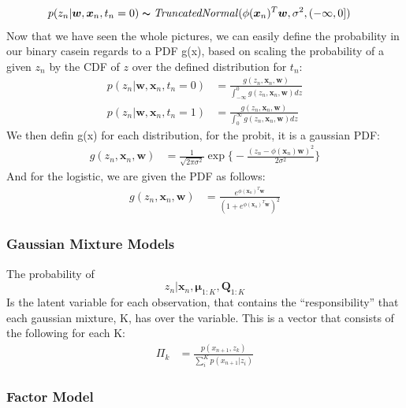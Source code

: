 \documentclass[a4paper,12pt]{article}\usepackage[]{graphicx}\usepackage[]{color}
\begin{document}
%
\begin{align*}
p(z_n | \bm{w}, \bm{x}_n, t_n = 0) &\thicksim \mathit{TruncatedNormal}(\phi(\bm{x}_n)^T\bm{w}, \sigma^2, (-\infty, 0])
\end{align*}
Now that we have seen the whole pictures, we can easily define the probability in our binary casein regards to a PDF g(x), based on scaling the probability of a given $z_n$ by the CDF of $z$ over the defined distribution for $t_n$:
\begin{align*}
p(z_n | \bm{w}, \bm{x}_n, t_n = 0) &= \frac{ g(z_n, \bm{x}_n, \bm{w})}{ \int_{-\infty}^{0} g(z_n, \bm{x}_n, \bm{w})  dz} \\
p(z_n | \bm{w}, \bm{x}_n, t_n = 1) &= \frac{ g(z_n, \bm{x}_n, \bm{w})}{ \int_{0}^{\infty} g(z_n, \bm{x}_n, \bm{w})  dz}
\end{align*}
We then defin g(x) for each distribution, for the probit, it is a gaussian PDF:
\begin{align*}
g(z_n, \bm{x}_n, \bm{w}) &= \frac{1}{\sqrt{2\pi\sigma^2}} \exp \Big\{  - \frac{(z_n - \phi(\bm{x}_n)\bm{w})^2}{2\sigma^2} \Big\}
\end{align*}
And for the logistic, we are given the PDF as follows:
\begin{align*}
g(z_n, \bm{x}_n, \bm{w}) &= \frac{e^{ \phi(\bm{x}_n)^T\bm{w}}}{(1 + e^{ \phi(\bm{x}_n)^T\bm{w}})^2}
\end{align*}
\subsubsection*{Gaussian Mixture Models}

The probability of
$$
z_n | \bm{x}_n, \bm{\mu}_{1:K}, \bm{Q}_{1:K}
$$
Is the latent variable for each observation, that contains the ``responsibility'' that each gaussian mixture, K, has over the variable. This is a vector that consists of the following for each K:
\begin{align*}
\Pi_k &= \frac{p(x_{n+1}, z_k)}{\sum_i^K p(x_{n+1} | z_i)}
\end{align*}


\subsubsection*{Factor Model}
\end{document}
